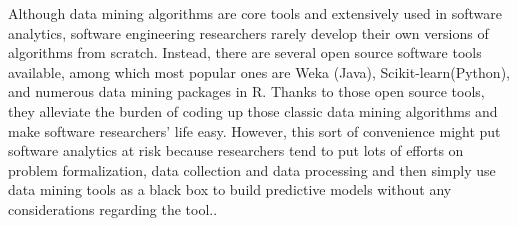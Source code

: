 Although data mining algorithms are core tools and extensively used in software analytics, software engineering 
researchers rarely develop their own versions of algorithms from scratch. Instead, there are
several open source software tools available, among which most popular ones are Weka (Java)\cite{hall2009weka}, 
Scikit-learn(Python)\cite{scikit-learn}, and numerous data mining packages in R. Thanks to those open 
source tools, they alleviate the burden of coding up those classic data mining algorithms and make
software researchers' life easy. However, this sort of convenience might put 
software analytics at risk because researchers tend to put lots of efforts on problem formalization, 
data collection and data processing and then simply use data mining tools as a black box to build 
predictive models without any considerations regarding the tool.\cite{sun2010discriminative,jalbert2008automated, antoniol2008bug,zanetti2013categorizing,lamkanfi2011comparing,tian2013drone, alipour2013contextual,lin2009empirical,hall11,me07b,choetkiertikul2015predicting,anvik2006should, bhattacharya2010fine}.




